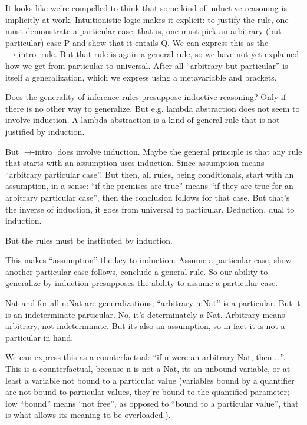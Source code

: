 \documentclass{article}
\begin{document}
It looks like we're compelled to think that some kind of inductive
reasoning is implicitly at work. Intuitionistic logic makes it
explicit: to justify the rule, one must demonstrate a particular case,
that is, one must pick an arbitrary (but particular) case P and show
that it entails Q. We can express this as the
\(\rightarrow\scriptstyle{\text{-intro}}\) rule. But that rule is
again a general rule, so we have not yet explained how we get from
particular to universal. After all ``arbitrary but particular'' is
itself a generalization, which we express using a metavariable and
brackets.

Does the generality of inference rules presuppose inductive reasoning?
Only if there is no other way to generalize. But e.g. lambda
abstraction does not seem to involve induction. A lambda abstraction
is a kind of general rule that is not justified by induction.

But \(\rightarrow\scriptstyle{\text{-intro}}\) does involve induction.
Maybe the general principle is that any rule that starts with an
assumption uses induction. Since assumption means ``arbitrary
particular case''. But then, all rules, being conditionals, start with
an assumption, in a sense: ``if the premises are true'' means ``if
they are true for an arbitrary particular case'', then the conclusion
follows for that case. But that's the inverse of induction, it goes
from universal to particular. Deduction, dual to induction.

But the rules must be instituted by induction.

This makes ``assumption'' the key to induction. Assume a particular
case, show another particular case follows, conclude a general rule.
So our ability to generalize by induction presupposes the ability to
assume a particular case.

Nat and for all n:Nat are generalizations; ``arbitrary n:Nat'' is a
particular. But it is an indeterminate particular. No, it's
determinately a Nat. Arbitrary means arbitrary, not indeterminate. But
its also an assumption, so in fact it is not a particular in hand.

We can express this as a counterfactual: ``if n were an arbitrary Nat,
then ...''. This is a counterfactual, because n is not a Nat, its an
unbound variable, or at least a variable not bound to a particular
value (variables bound by a quantifier are not bound to particular
values, they're bound to the quantified parameter; iow ``bound'' means
``not free'', as opposed to ``bound to a particular value'', that is
what allows its meaning to be overloaded.).
\end{document}
